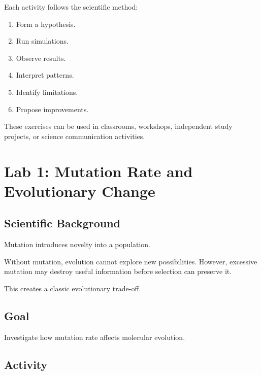 \documentclass[
  oneside,
  openany]{book}
\providecommand{\tightlist}{%
  \setlength{\itemsep}{0pt}\setlength{\parskip}{0pt}}
\begin{document}
Each activity follows the scientific method:

\begin{enumerate}
\def\labelenumi{\arabic{enumi}.}
\tightlist
\item
  Form a hypothesis.
\item
  Run simulations.
\item
  Observe results.
\item
  Interpret patterns.
\item
  Identify limitations.
\item
  Propose improvements.
\end{enumerate}

These exercises can be used in classrooms, workshops, independent study projects, or science communication activities.

\section{Lab 1: Mutation Rate and Evolutionary Change}\label{lab-1-mutation-rate-and-evolutionary-change}

\subsection{Scientific Background}\label{scientific-background}

Mutation introduces novelty into a population.

Without mutation, evolution cannot explore new possibilities. However, excessive mutation may destroy useful information before selection can preserve it.

This creates a classic evolutionary trade-off.

\subsection{Goal}\label{goal}

Investigate how mutation rate affects molecular evolution.

\subsection{Activity}\label{activity}
\end{document}

